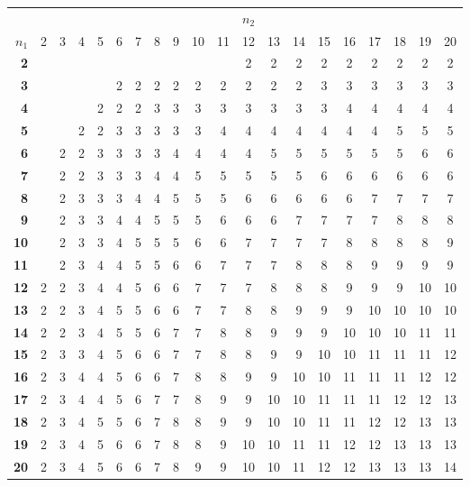 \documentclass[12pt,a4paper]{article}
\begin{document}
\begin{center}
\footnotesize
\setlength{\tabcolsep}{2pt}
\begin{tabular*}{\linewidth}{@{\extracolsep{\fill}}rccccccccccccccccccc@{}}
\toprule
& \multicolumn{19}{c}{$n_2$} \\
$n_1$ & 2 & 3 & 4 & 5 & 6 & 7 & 8 & 9 & 10 & 11 & 12 & 13 & 14 & 15 & 16 & 17 & 18 & 19 & 20 \\
\midrule
\textbf{2} &  &  &  &  &  &  &  &  &  &  & 2 & 2 & 2 & 2 & 2 & 2 & 2 & 2 & 2 \\
\textbf{3} &  &  &  &  & 2 & 2 & 2 & 2 & 2 & 2 & 2 & 2 & 2 & 3 & 3 & 3 & 3 & 3 & 3 \\
\textbf{4} &  &  &  & 2 & 2 & 2 & 3 & 3 & 3 & 3 & 3 & 3 & 3 & 3 & 4 & 4 & 4 & 4 & 4 \\
\textbf{5} &  &  & 2 & 2 & 3 & 3 & 3 & 3 & 3 & 4 & 4 & 4 & 4 & 4 & 4 & 4 & 5 & 5 & 5 \\
\textbf{6} &  & 2 & 2 & 3 & 3 & 3 & 3 & 4 & 4 & 4 & 4 & 5 & 5 & 5 & 5 & 5 & 5 & 6 & 6 \\
\textbf{7} &  & 2 & 2 & 3 & 3 & 3 & 4 & 4 & 5 & 5 & 5 & 5 & 5 & 6 & 6 & 6 & 6 & 6 & 6 \\
\textbf{8} &  & 2 & 3 & 3 & 3 & 4 & 4 & 5 & 5 & 5 & 6 & 6 & 6 & 6 & 6 & 7 & 7 & 7 & 7 \\
\textbf{9} &  & 2 & 3 & 3 & 4 & 4 & 5 & 5 & 5 & 6 & 6 & 6 & 7 & 7 & 7 & 7 & 8 & 8 & 8 \\
\textbf{10} &  & 2 & 3 & 3 & 4 & 5 & 5 & 5 & 6 & 6 & 7 & 7 & 7 & 7 & 8 & 8 & 8 & 8 & 9 \\
\textbf{11} &  & 2 & 3 & 4 & 4 & 5 & 5 & 6 & 6 & 7 & 7 & 7 & 8 & 8 & 8 & 9 & 9 & 9 & 9 \\
\textbf{12} & 2 & 2 & 3 & 4 & 4 & 5 & 6 & 6 & 7 & 7 & 7 & 8 & 8 & 8 & 9 & 9 & 9 & 10 & 10 \\
\textbf{13} & 2 & 2 & 3 & 4 & 5 & 5 & 6 & 6 & 7 & 7 & 8 & 8 & 9 & 9 & 9 & 10 & 10 & 10 & 10 \\
\textbf{14} & 2 & 2 & 3 & 4 & 5 & 5 & 6 & 7 & 7 & 8 & 8 & 9 & 9 & 9 & 10 & 10 & 10 & 11 & 11 \\
\textbf{15} & 2 & 3 & 3 & 4 & 5 & 6 & 6 & 7 & 7 & 8 & 8 & 9 & 9 & 10 & 10 & 11 & 11 & 11 & 12 \\
\textbf{16} & 2 & 3 & 4 & 4 & 5 & 6 & 6 & 7 & 8 & 8 & 9 & 9 & 10 & 10 & 11 & 11 & 11 & 12 & 12 \\
\textbf{17} & 2 & 3 & 4 & 4 & 5 & 6 & 7 & 7 & 8 & 9 & 9 & 10 & 10 & 11 & 11 & 11 & 12 & 12 & 13 \\
\textbf{18} & 2 & 3 & 4 & 5 & 5 & 6 & 7 & 8 & 8 & 9 & 9 & 10 & 10 & 11 & 11 & 12 & 12 & 13 & 13 \\
\textbf{19} & 2 & 3 & 4 & 5 & 6 & 6 & 7 & 8 & 8 & 9 & 10 & 10 & 11 & 11 & 12 & 12 & 13 & 13 & 13 \\
\textbf{20} & 2 & 3 & 4 & 5 & 6 & 6 & 7 & 8 & 9 & 9 & 10 & 10 & 11 & 12 & 12 & 13 & 13 & 13 & 14 \\
\bottomrule
\end{tabular*}
\end{center}
\end{document}
